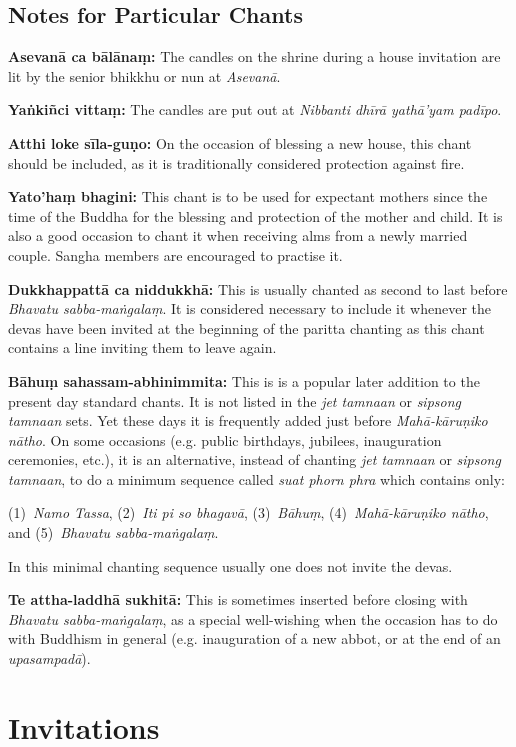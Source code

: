 \subsection*{Notes for Particular Chants}

\textbf{Asevanā ca bālānaṃ:} The candles on the shrine during a house invitation
are lit by the senior bhikkhu or nun at \emph{Asevanā}.

\textbf{Yaṅkiñci vittaṃ:} The candles are put out at \emph{Nibbanti
  dhīrā yathā'yam padīpo}.

\textbf{Atthi loke sīla-guṇo:} On the occasion of blessing a new house, this
chant should be included, as it is traditionally considered protection against
fire.

\textbf{Yato'haṃ bhagini:} This chant is to be used for expectant mothers since
the time of the Buddha for the blessing and protection of the mother and child.
It is also a good occasion to chant it when receiving alms from a newly married
couple. Sangha members are encouraged to practise it.

\textbf{Dukkhappattā ca niddukkhā:} This is usually chanted as second to last
before \emph{Bhavatu sabba-maṅgalaṃ}. It is considered necessary to include it
whenever the devas have been invited at the beginning of the paritta chanting
as this chant contains a line inviting them to leave again.

\textbf{Bāhuṃ sahassam-abhinimmita:} This is is a popular later addition to the
present day standard chants. It is not listed in the \emph{jet tamnaan} or
\emph{sipsong tamnaan} sets. Yet these days it is frequently added just before
\emph{Mahā-kāruṇiko nātho}. On some occasions (e.g. public birthdays, jubilees,
inauguration ceremonies, etc.), it is an alternative, instead of chanting
\emph{jet tamnaan} or \emph{sipsong tamnaan}, to do a minimum sequence called
\emph{suat phorn phra} which contains only:

(1)~\emph{Namo Tassa},
(2)~\emph{Iti pi so bhagavā},
(3)~\emph{Bāhuṃ}, 
(4)~\emph{Mahā-kāruṇiko nātho}, and
(5)~\emph{Bhavatu sabba-maṅgalaṃ}.

In this minimal chanting sequence usually one does not invite the devas.

\textbf{Te attha-laddhā sukhitā:} This is sometimes inserted before closing with
\emph{Bhavatu sabba-maṅgalaṃ}, as a special well-wishing when the occasion has
to do with Buddhism in general (e.g. inauguration of a new abbot, or at the end
of an \emph{upasampadā}).

\section{Invitations}

